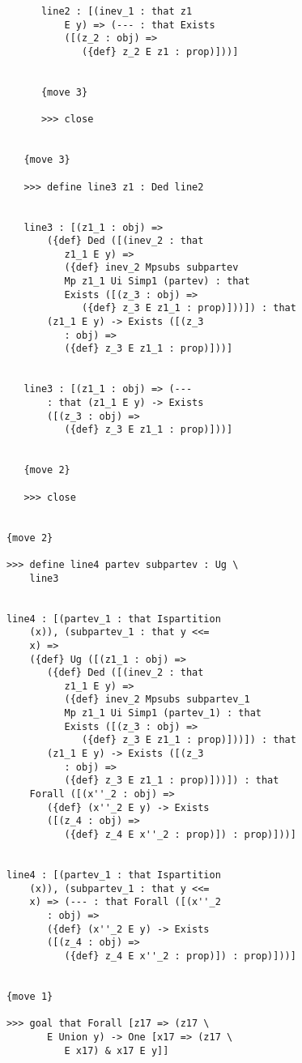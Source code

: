 \documentclass[12pt]{article}
\begin{document}
\begin{verbatim}
            line2 : [(inev_1 : that z1 
                E y) => (--- : that Exists 
                ([(z_2 : obj) => 
                   ({def} z_2 E z1 : prop)]))]


            {move 3}

            >>> close


         {move 3}

         >>> define line3 z1 : Ded line2


         line3 : [(z1_1 : obj) => 
             ({def} Ded ([(inev_2 : that 
                z1_1 E y) => 
                ({def} inev_2 Mpsubs subpartev 
                Mp z1_1 Ui Simp1 (partev) : that 
                Exists ([(z_3 : obj) => 
                   ({def} z_3 E z1_1 : prop)]))]) : that 
             (z1_1 E y) -> Exists ([(z_3 
                : obj) => 
                ({def} z_3 E z1_1 : prop)]))]


         line3 : [(z1_1 : obj) => (--- 
             : that (z1_1 E y) -> Exists 
             ([(z_3 : obj) => 
                ({def} z_3 E z1_1 : prop)]))]


         {move 2}

         >>> close


      {move 2}

      >>> define line4 partev subpartev : Ug \
          line3


      line4 : [(partev_1 : that Ispartition 
          (x)), (subpartev_1 : that y <<= 
          x) => 
          ({def} Ug ([(z1_1 : obj) => 
             ({def} Ded ([(inev_2 : that 
                z1_1 E y) => 
                ({def} inev_2 Mpsubs subpartev_1 
                Mp z1_1 Ui Simp1 (partev_1) : that 
                Exists ([(z_3 : obj) => 
                   ({def} z_3 E z1_1 : prop)]))]) : that 
             (z1_1 E y) -> Exists ([(z_3 
                : obj) => 
                ({def} z_3 E z1_1 : prop)]))]) : that 
          Forall ([(x''_2 : obj) => 
             ({def} (x''_2 E y) -> Exists 
             ([(z_4 : obj) => 
                ({def} z_4 E x''_2 : prop)]) : prop)]))]


      line4 : [(partev_1 : that Ispartition 
          (x)), (subpartev_1 : that y <<= 
          x) => (--- : that Forall ([(x''_2 
             : obj) => 
             ({def} (x''_2 E y) -> Exists 
             ([(z_4 : obj) => 
                ({def} z_4 E x''_2 : prop)]) : prop)]))]


      {move 1}

      >>> goal that Forall [z17 => (z17 \
             E Union y) -> One [x17 => (z17 \
                E x17) & x17 E y]]



\end{verbatim}
\end{document}
